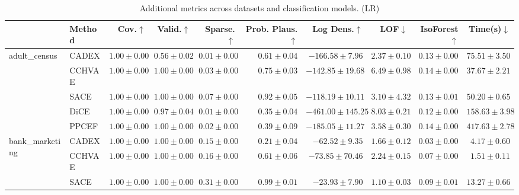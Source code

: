 \begin{table}[ht]
\centering
\caption{Additional metrics across datasets and classification models. (LR)}
\label{tab:other_metrics_multinomiallogisticregression}
\begin{center}
\begin{sc}
\begin{scriptsize}
\begin{tabular}{l|l|rrrrrrrr}
\toprule
 & Method & Cov.$\uparrow$ & Valid.$\uparrow$ & Sparse.$\uparrow$ & Prob. Plaus.$\uparrow$ & Log Dens.$\uparrow$ & LOF$\downarrow$ & IsoForest$\uparrow$ & Time(s)$\downarrow$ \\
\midrule
\multirow{5}{*}{adult\_census} & CADEX & $\boldsymbol{1.00\pm{0.00}}$ & $0.56\pm{0.02}$ & $0.01\pm{0.00}$ & $0.61\pm{0.04}$ & $-166.58\pm{7.96}$ & $\boldsymbol{2.37\pm{0.10}}$ & $0.13\pm{0.00}$ & $75.51\pm{3.50}$ \\
 & CCHVAE & $\boldsymbol{1.00\pm{0.00}}$ & $\boldsymbol{1.00\pm{0.00}}$ & $0.03\pm{0.00}$ & $0.75\pm{0.03}$ & $-142.85\pm{19.68}$ & $6.49\pm{0.98}$ & $\boldsymbol{0.14\pm{0.00}}$ & $\boldsymbol{37.67\pm{2.21}}$ \\
 & SACE & $\boldsymbol{1.00\pm{0.00}}$ & $\boldsymbol{1.00\pm{0.00}}$ & $\boldsymbol{0.07\pm{0.00}}$ & $\boldsymbol{0.92\pm{0.05}}$ & $\boldsymbol{-118.19\pm{10.11}}$ & $3.10\pm{4.32}$ & $0.13\pm{0.01}$ & $50.20\pm{0.65}$ \\
 & DiCE & $\boldsymbol{1.00\pm{0.00}}$ & $0.97\pm{0.04}$ & $0.01\pm{0.00}$ & $0.35\pm{0.04}$ & $-461.00\pm{145.25}$ & $8.03\pm{0.21}$ & $0.12\pm{0.00}$ & $158.63\pm{3.98}$ \\
 & PPCEF & $\boldsymbol{1.00\pm{0.00}}$ & $\boldsymbol{1.00\pm{0.00}}$ & $0.02\pm{0.00}$ & $0.39\pm{0.09}$ & $-185.05\pm{11.27}$ & $3.58\pm{0.30}$ & $\boldsymbol{0.14\pm{0.00}}$ & $417.63\pm{2.78}$ \\
\midrule
\multirow{5}{*}{bank\_marketing} & CADEX & $\boldsymbol{1.00\pm{0.00}}$ & $\boldsymbol{1.00\pm{0.00}}$ & $0.15\pm{0.00}$ & $0.21\pm{0.04}$ & $-62.52\pm{9.35}$ & $1.66\pm{0.12}$ & $0.03\pm{0.00}$ & $4.17\pm{0.60}$ \\
 & CCHVAE & $\boldsymbol{1.00\pm{0.00}}$ & $\boldsymbol{1.00\pm{0.00}}$ & $0.16\pm{0.00}$ & $0.61\pm{0.06}$ & $-73.85\pm{70.46}$ & $2.24\pm{0.15}$ & $0.07\pm{0.00}$ & $\boldsymbol{1.51\pm{0.11}}$ \\
 & SACE & $\boldsymbol{1.00\pm{0.00}}$ & $\boldsymbol{1.00\pm{0.00}}$ & $\boldsymbol{0.31\pm{0.00}}$ & $\boldsymbol{0.99\pm{0.01}}$ & $\boldsymbol{-23.93\pm{7.90}}$ & $\boldsymbol{1.10\pm{0.03}}$ & $\boldsymbol{0.09\pm{0.01}}$ & $13.27\pm{0.66}$ \\

\end{tabular}
\end{scriptsize}
\end{sc}
\end{center}
\end{table}
